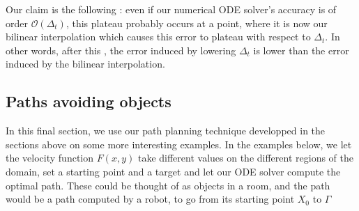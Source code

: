 \documentclass[11pt]{article}
\theoremstyle{definition}
\theoremstyle{remark}
\begin{document}
\FloatBarrier

\noindent Our claim is the following : even if our numerical ODE solver's accuracy is of order $\mathcal{O}(\Delta_t)$, this plateau probably occurs at a point, where it is now our bilinear interpolation which causes this error to plateau with respect to $\Delta_t$. In other words, after this , the error induced by lowering $\Delta_t$ is lower than the error induced by the bilinear interpolation.

\subsection{Paths avoiding objects}
In this final section, we use our path planning technique developped in the sections above on some more interesting examples. In the examples below, we let the velocity function $F(x,y)$ take different values on the different regions of the domain, set a starting point and a target and let our ODE solver compute the optimal path. These could be thought of as objects in a room, and the path would be a path computed by a robot, to go from its starting point $X_0$ to $\Gamma$
\end{document}
